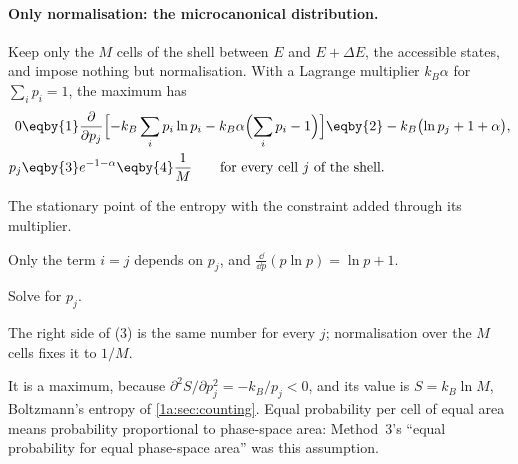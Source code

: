 \paragraph{Only normalisation: the microcanonical distribution.}
Keep only the $M$ cells of the shell between $E$ and $E+\Delta E$, the accessible
states, and impose nothing but normalisation. With a Lagrange multiplier $k_B\alpha$
for $\sum_ip_i=1$, the maximum has
\begin{align*}
  0
  &\eqby{1}\frac{\partial}{\partial p_j}\Bigl[-k_B\sum_ip_i\ln p_i
       -k_B\alpha\Bigl(\sum_ip_i-1\Bigr)\Bigr]
   \eqby{2}-k_B\bigl(\ln p_j+1+\alpha\bigr),
  \\
  p_j
  &\eqby{3}e^{-1-\alpha}
   \eqby{4}\frac1M\qquad\text{for every cell } j \text{ of the shell}.
\end{align*}
\begin{explain}
  \item The stationary point of the entropy with the constraint added through its
        multiplier.
  \item Only the term $i=j$ depends on $p_j$, and $\frac{\dd}{\dd p}(p\ln p)=\ln p+1$.
  \item Solve for $p_j$.
  \item The right side of (3) is the same number for every $j$; normalisation over
        the $M$ cells fixes it to $1/M$.
\end{explain}
It is a maximum, because $\partial^2S/\partial p_j^2=-k_B/p_j<0$, and its value is
$S=k_B\ln M$, Boltzmann's entropy of \cref{1a:sec:counting}. Equal probability per
cell of equal area means probability proportional to phase-space area: Method~3's
``equal probability for equal phase-space area'' was this assumption.

